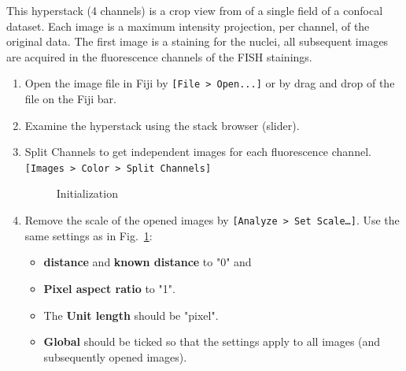\documentclass[11pt,a4paper,oneside]{report}
\newcommand{\ijmenu}[1]{\texttt{\small#1}}
\begin{document}
This hyperstack (4 channels) is a crop view from of a single field of a confocal dataset.
Each image is a maximum intensity projection, per channel, of the original data. 
The first image is a staining for the nuclei, all subsequent images are acquired in the fluorescence channels of the FISH stainings.

\begin{enumerate}
    \item Open the image file in Fiji by
    \ijmenu{[File > Open...]} or by drag and drop of the file on the Fiji bar.
    
    \item Examine the hyperstack using the stack browser (slider).
    
    \item Split Channels to get independent images for each fluorescence channel.
    \ijmenu{[Images > Color > Split Channels]}
    
    \begin{figure}[htbp]
        \centering
         \caption{Initialization}
         \label{fig:init}
    \end{figure}
    
    \item Remove the scale of the opened images by 
    \ijmenu{[Analyze > Set Scale\ldots]}. 
    Use the same settings as in Fig.~\ref{fig:init}:
    \begin{itemize}  
        \item\textbf{distance} and \textbf{known distance} to "0" and  
        \item\textbf{Pixel aspect ratio} to "1".  
        \item The \textbf{Unit length} should be "pixel". 
        \item  \textbf{Global} should be ticked so that the settings apply to all images (and subsequently opened images). 


\end{itemize}
\end{enumerate}
\end{document}
